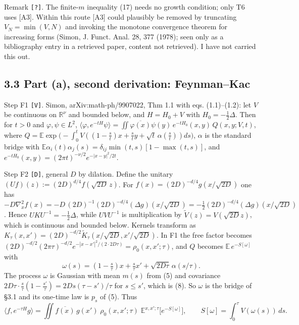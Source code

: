 \documentclass[11pt,a4paper]{article}
\begin{document}
Remark \texttt{[?]}. The finite-\(m\) inequality (17) needs no growth condition; only T6 uses {[}A3{]}. Within this route {[}A3{]} could plausibly be removed by truncating \(V_N=\min(V,N)\) and invoking the monotone convergence theorem for increasing forms (Simon, J. Funct. Anal. 28, 377 (1978); seen only as a bibliography entry in a retrieved paper, content not retrieved). I have not carried this out.

\hypertarget{part-a-second-derivation-feynmankac}{%
\subsection{3.3 Part (a), second derivation: Feynman--Kac}\label{part-a-second-derivation-feynmankac}}

Step F1 \texttt{[V]}. Simon, arXiv:math-ph/9907022, Thm 1.1 with eqs. (1.1)--(1.2): let \(V\) be continuous on \(\mathbb R^\nu\) and bounded below, and \(H=H_0+V\) with \(H_0=-\tfrac12\Delta\). Then for \(t>0\) and \(\varphi,\psi\in L^2\),
\(\langle\varphi,e^{-tH}\psi\rangle=\iint\overline{\varphi(x)}\psi(y)\,e^{-tH_0}(x,y)\,Q(x,y;V,t)\), where
\(Q=\mathbb E\exp\!\big(-\int_0^tV((1-\tfrac st)x+\tfrac sty+\sqrt t\,\alpha(\tfrac st))ds\big)\),
\(\alpha\) is the standard bridge with \(\mathbb E\alpha_i(t)\alpha_j(s)=\delta_{ij}\min(t,s)[1-\max(t,s)]\), and \(e^{-tH_0}(x,y)=(2\pi t)^{-\nu/2}e^{-|x-y|^2/2t}\).

Step F2 \texttt{[D]}, general \(D\) by dilation. Define the unitary \((Uf)(z):=(2D)^{d/4}f(\sqrt{2D}\,z)\). For \(f(x)=(2D)^{-d/4}g(x/\sqrt{2D})\) one has \(-D\nabla_x^2f(x)=-D\,(2D)^{-1}(2D)^{-d/4}(\Delta g)(x/\sqrt{2D})=-\tfrac12(2D)^{-d/4}(\Delta g)(x/\sqrt{2D})\). Hence \(UKU^{-1}=-\tfrac12\Delta\), while \(UVU^{-1}\) is multiplication by \(\tilde V(z)=V(\sqrt{2D}z)\), which is continuous and bounded below. Kernels transform as \(K_\tau(x,x')=(2D)^{-d/2}\tilde K_\tau(x/\sqrt{2D},x'/\sqrt{2D})\). In F1 the free factor becomes \((2D)^{-d/2}(2\pi\tau)^{-d/2}e^{-|x-x'|^2/(2\cdot 2D\tau)}=\rho_0(x,x';\tau)\), and \(Q\) becomes \(\mathbb E\,e^{-S[\omega]}\) with
\[\omega(s)=(1-\tfrac s\tau)x+\tfrac s\tau x'+\sqrt{2D\tau}\,\alpha(s/\tau).\]
The process \(\omega\) is Gaussian with mean \(m(s)\) from (5) and covariance \(2D\tau\cdot\frac s\tau(1-\frac{s'}\tau)=2Ds(\tau-s')/\tau\) for \(s\le s'\), which is (8). So \(\omega\) is the bridge of §3.1 and its one-time law is \(p_s\) of (5). Thus
\[\langle f,e^{-\tau H}g\rangle=\iint\overline{f(x)}\,g(x')\;\rho_0(x,x';\tau)\;\mathbb E^{x,x';\tau}\big[e^{-S[\omega]}\big],\qquad S[\omega]=\int_0^\tau V(\omega(s))\,ds.\tag{19}\]
\end{document}
